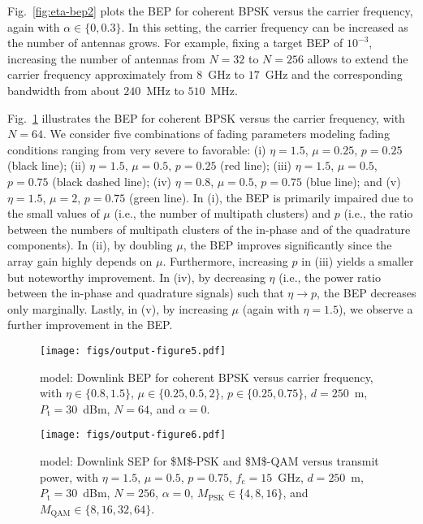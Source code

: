 \documentclass[journal,twocolumn]{IEEEtran}
\begin{document}
Fig.~\ref{fig:eta-bep2} plots the \ac{BEP} for coherent \ac{BPSK} versus the carrier frequency, again with $\alpha\in \{0,0.3\}$. In this setting, the carrier frequency can be increased as the number of antennas grows. For example, fixing a target \ac{BEP} of $10^{-3}$, increasing the number of antennas from $N=32$ to $N=256$ allows to extend the carrier frequency approximately from $8$~GHz to $17$~GHz and the corresponding bandwidth from about $240$~MHz to $510$~MHz.

Fig.~\ref{fig:eta-bep4} illustrates the \ac{BEP} for coherent \ac{BPSK} versus the carrier frequency, with $N=64$. We consider five combinations of fading parameters modeling fading conditions ranging from very severe to favorable: (i) $\eta = 1.5$, $\mu = 0.25$, $p=0.25$ (black line); (ii) $\eta = 1.5$, $\mu = 0.5$, $p=0.25$ (red line); (iii) $\eta = 1.5$, $\mu = 0.5$, $p=0.75$ (black dashed line); (iv) $\eta = 0.8$, $\mu = 0.5$, $p=0.75$ (blue line); and (v) $\eta = 1.5$, $\mu = 2$, $p=0.75$ (green line). In (i), the \ac{BEP} is primarily impaired due to the small values of $\mu$ (i.e., the number of multipath clusters) and $p$ (i.e., the ratio between the numbers of multipath clusters of the in-phase and of the quadrature components). In (ii), by doubling $\mu$, the \ac{BEP} improves significantly since the array gain highly depends on $\mu$. Furthermore, increasing $p$ in (iii) yields a smaller but noteworthy improvement. In (iv), by decreasing $\eta$ (i.e., the power ratio between the in-phase and quadrature signals) such that $\eta\to p$, the \ac{BEP} decreases only marginally. Lastly, in (v), by increasing $\mu$ (again with $\eta = 1.5$), we observe a further improvement in the \ac{BEP}.

\begin{figure}[t]
    \centering
    \texttt{[image: figs/output-figure5.pdf]}
    \caption{\Ehm{} model: Downlink \ac{BEP} for coherent \ac{BPSK} versus carrier frequency, with $\eta \in \{0.8,1.5\}$, $\mu \in \{0.25,0.5,2\}$, $p \in \{0.25,0.75\}$, $d = 250$~m, $P_{\textrm{t}} = 30$~dBm, $N= 64$, and $\alpha=0$.}
    \label{fig:eta-bep4}
\end{figure}

\begin{figure}[t]
    \centering
    \texttt{[image: figs/output-figure6.pdf]}
    \caption{\Ehm{} model: Downlink \ac{SEP} for \ac{$M$-PSK} and \ac{$M$-QAM} versus transmit power, with $\eta = 1.5$, $\mu = 0.5$, $p=0.75$, $f_{\textrm{c}} = 15$~GHz, $d = 250$~m, $P_{\textrm{t}} = 30$~dBm, $N = 256$, $\alpha=0$, $M_{\textrm{PSK}} \in \{4,8,16 \}$, and $M_{\textrm{QAM}} \in \{8,16,32,64\}$.}
    \label{fig:eta-sep1}
\end{figure}
\end{document}
